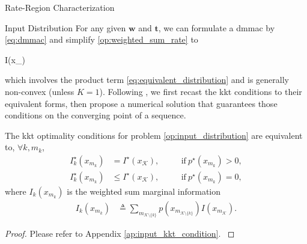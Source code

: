 \begin{section}{Rate-Region Characterization}
	\begin{subsection}{Input Distribution}
		\label{sc:input_distribution}
		For any given $\boldsymbol{w}$ and $\boldsymbol{t}$, we can formulate a \gls{dmmac} by \eqref{eq:dmmac} and simplify \eqref{op:weighted_sum_rate} to
		\begin{maxi!}
			{}{I(x_{})}{\label{op:input_distribution}}{}
			\addConstraint{\eqref{co:sum_probability},\eqref{co:nonnegative_probability},}
		\end{maxi!}
		which involves the product term \eqref{eq:equivalent_distribution} and is generally non-convex (unless $K=1$).
		Following \cite{Rezaeian2004}, we first recast the \gls{kkt} conditions to their equivalent forms, then propose a numerical solution that guarantees those conditions on the converging point of a sequence.
		\begin{proposition}
			The \gls{kkt} optimality conditions for problem \eqref{op:input_distribution} are equivalent to, $\forall k,m_k$,
			\begin{subequations}
				\label{eq:input_kkt_condition}
				\begin{alignat}{2}
					I_k^\star(x_{m_k}) & = I^\star(x_{\mathcal{K}}), \quad   &  & \text{if} \ p^\star(x_{m_k}) > 0,\label{eq:probable_states} \\
					I_k^\star(x_{m_k}) & \le I^\star(x_{\mathcal{K}}), \quad &  & \text{if} \ p^\star(x_{m_k}) = 0,\label{eq:dropped_states}
				\end{alignat}
			\end{subequations}
			where $I_k(x_{m_k})$ is the weighted sum marginal information
			\begin{align}
				I_k(x_{m_k})
				 & \triangleq \sum_{m_{\mathcal{K} \setminus \{k\}}} p(x_{m_{\mathcal{K} \setminus \{k\}}}) I(x_{m_\mathcal{K}}).
				\label{eq:weighted_sum_marginal_information}
			\end{align}
			\label{pr:input_kkt_condition}
		\end{proposition}

		\begin{proof}
			Please refer to Appendix \ref{ap:input_kkt_condition}.
			\label{pf:input_kkt_condition}
		\end{proof}


\end{subsection}
\end{section}
